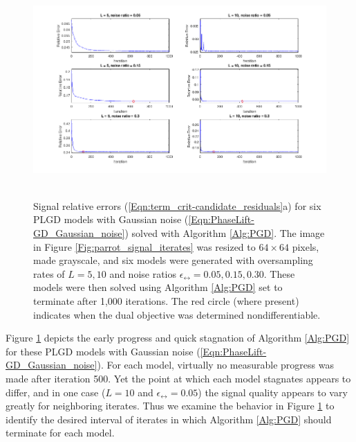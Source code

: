 \newpage

\begin{figure}[H]
\centering
\hbox{\hspace{-2.0cm} \includegraphics[scale=0.6]{term_crit-signal_err} }\vspace{-0.4cm}
\caption{Signal relative errors (\ref{Eqn:term_crit-candidate_residuals}a) for six PLGD models with Gaussian noise (\ref{Eqn:PhaseLift-GD_Gaussian_noise})  solved with Algorithm \ref{Alg:PGD}. The image in Figure \ref{Fig:parrot_signal_iterates} was resized to $64 \times 64$ pixels, made grayscale, and six models were generated with oversampling rates of $L = 5, 10$ and noise ratios $\epsilon_\rel = 0.05, 0.15, 0.30$.  These models were then solved using Algorithm \ref{Alg:PGD} set to terminate after 1,000 iterations.  The red circle (where present) indicates when the dual objective was determined nondifferentiable.}
\label{Fig:term_crit-signal_err}
\end{figure}

Figure \ref{Fig:term_crit-signal_err} depicts the early progress and quick stagnation of Algorithm \ref{Alg:PGD} for these PLGD models with Gaussian noise (\ref{Eqn:PhaseLift-GD_Gaussian_noise}).  For each model, virtually no measurable progress was made after iteration 500.  Yet the point at which each model stagnates appears to differ, and in one case ($L = 10$ and $\epsilon_\rel = 0.05$) the signal quality appears to vary greatly for neighboring iterates.  Thus we examine the behavior in Figure \ref{Fig:term_crit-signal_err} to identify the desired interval of iterates in which Algorithm \ref{Alg:PGD} should terminate for each model.




